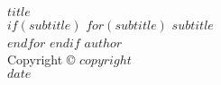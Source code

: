 \begin{titlepage}
    \centering
    \vspace*{5cm}
    {\Huge \textbf{$title$}}\\[1cm]
    $if(subtitle)$
        $for(subtitle)$
            {\large \textit{$subtitle$}}\\
        $endfor$
    $endif$
    \vspace*{5cm}
    {\Large $author$}\\[0.5cm]
    {\small Copyright \copyright{} $copyright$}\\[0.5cm]
    {\large $date$}
\end{titlepage}
